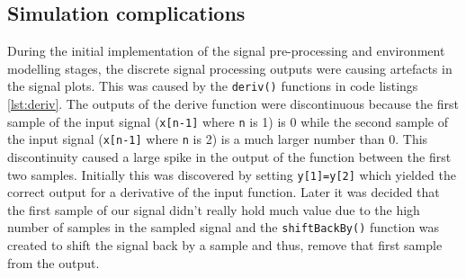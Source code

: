 \subsection{Simulation complications}
During the initial implementation of the signal pre-processing and environment modelling stages, the discrete signal processing outputs were causing artefacts in the signal plots. This was caused by the \texttt{deriv()} functions in code listings \ref{lst:deriv}. The outputs of the derive function were discontinuous because the first sample of the input signal (\texttt{x[n-1]} where \texttt{n} is 1) is 0 while the second sample of the input signal (\texttt{x[n-1]} where \texttt{n} is 2) is a much larger number than 0. This discontinuity caused a large spike in the output of the function between the first two samples. Initially this was discovered by setting \texttt{y[1]=y[2]} which yielded the correct output for a derivative of the input function. Later it was decided that the first sample of our signal didn't really hold much value due to the high number of samples in the sampled signal and the \texttt{shiftBackBy()} function was created to shift the signal back by a sample and thus, remove that first sample from the output.